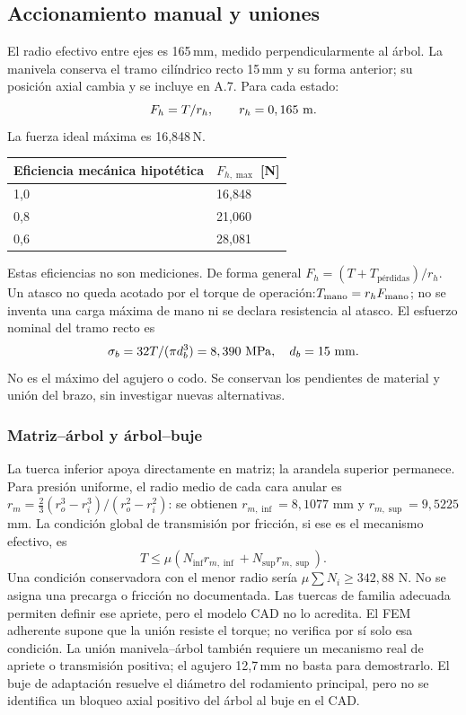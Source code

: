 \subsection{Accionamiento manual y uniones}
\label{app:prototipo_A8}
El radio efectivo entre ejes es 165\,mm, medido perpendicularmente al árbol.
La manivela conserva el tramo cilíndrico recto 15\,mm y su forma anterior;
su posición axial cambia y se incluye en A.7. Para cada estado:
\begin{equation}
 F_h=T/r_h,\qquad r_h=0,165\ {\rm m}.
\end{equation}
La fuerza ideal máxima es 16,848\,N.
\begin{center}\begin{tabular}{ll}\toprule
Eficiencia mecánica hipotética & $F_{h,\max}$ [N]\\\midrule
1,0 & 16,848\\
0,8 & 21,060\\
0,6 & 28,081\\
\bottomrule\end{tabular}\end{center}

Estas eficiencias no son mediciones. De forma general
$F_h=(T+T_{\text{pérdidas}})/r_h$. Un atasco no queda acotado por el torque
de operación:$T_{\rm mano}=r_hF_{\rm mano}$; no se inventa una carga máxima
de mano ni se declara resistencia al atasco.
El esfuerzo nominal del tramo recto es
\begin{equation}
 \sigma_b=32T/(\pi d_b^3)=8,390\ {\rm MPa},\quad d_b=15\ {\rm mm}.
\end{equation}
No es el máximo del agujero o codo. Se conservan los pendientes de
material y unión del brazo, sin investigar nuevas alternativas.

\subsubsection*{Matriz--árbol y árbol--buje}
La tuerca inferior apoya directamente en matriz; la arandela superior
permanece. Para presión uniforme, el radio medio de cada cara anular es
$r_m=\tfrac23(r_o^3-r_i^3)/(r_o^2-r_i^2)$: se obtienen
$r_{m,\inf}=8,1077$ mm y
$r_{m,\sup}=9,5225$ mm.
La condición global de transmisión por fricción, si ese es el mecanismo
efectivo, es
\begin{equation}
 T\leq\mu(N_{\inf}r_{m,\inf}+N_{\sup}r_{m,\sup}).
\end{equation}
Una condición conservadora con el menor radio sería
$\mu\sum N_i\geq342,88$ N.
No se asigna una precarga o fricción no documentada. Las tuercas de familia
adecuada permiten definir ese apriete, pero el modelo CAD no lo acredita.
El FEM adherente supone que la unión resiste el torque; no verifica por
sí solo esa condición. La unión manivela--árbol también requiere un
mecanismo real de apriete o transmisión positiva; el agujero 12,7\,mm no
basta para demostrarlo. El buje de adaptación resuelve el diámetro del
rodamiento principal, pero no se identifica un bloqueo axial positivo
del árbol al buje en el CAD.

